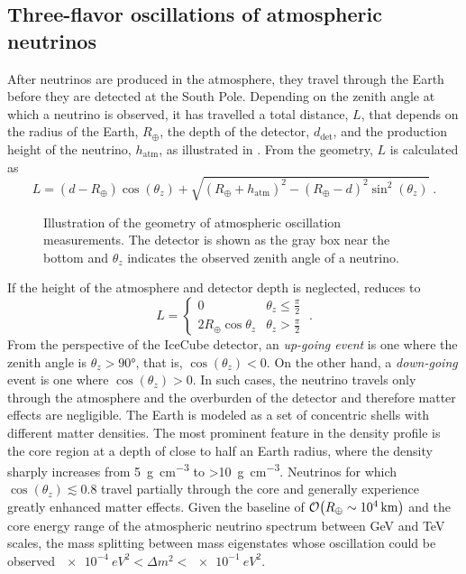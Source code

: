 \subsection{Three-flavor oscillations of atmospheric neutrinos}
After neutrinos are produced in the atmosphere, they travel through the Earth before they are detected at the South Pole. Depending on the zenith angle at which a neutrino is observed, it has travelled a total distance, $L$, that depends on the radius of the Earth, $R_\oplus$, the depth of the detector, $d_\mathrm{det}$, and the production height of the neutrino, $h_\mathrm{atm}$, as illustrated in . From the geometry, $L$ is calculated as
\begin{equation}
    L = (d - R_\oplus)\cos(\theta_z) + \sqrt{(R_\oplus + h_\mathrm{atm})^2 - (R_\oplus - d)^2\sin^2(\theta_z)}\;.\label{eq:prop-distance}
\end{equation}
\begin{figure}
    \centering
    
    \caption{Illustration of the geometry of atmospheric oscillation measurements. The detector is shown as the gray box near the bottom and $\theta_z$ indicates the observed zenith angle of a neutrino.\label{fig:atmo-baseline-illustration}}
\end{figure}
If the height of the atmosphere and detector depth is neglected,  reduces to
\begin{equation}
    L =
    \begin{cases}
        0 & \theta_z \leq \frac{\pi}{2} \\
        2 R_\oplus \cos \theta_z & \theta_z > \frac{\pi}{2}
    \end{cases}\;.
\end{equation}
From the perspective of the IceCube detector, an \emph{up-going event} is one where the zenith angle is $\theta_z > \ang{90}$, that is, $\cos(\theta_z) < 0$. On the other hand, a \emph{down-going} event is one where $\cos(\theta_z) > 0$. In such cases, the neutrino travels only through the atmosphere and the overburden of the detector and therefore matter effects are negligible.  The Earth is modeled as a set of concentric shells with different matter densities. The most prominent feature in the density profile is the core region at a depth of close to half an Earth radius, where the density sharply increases from \SI{5}{\gram\per\centi\meter\cubed} to \SI{>10}{\gram\per\centi\meter\cubed}\cite{PREM}. Neutrinos for which $\cos(\theta_z) \lesssim 0.8$ travel partially through the core and generally experience greatly enhanced matter effects. Given the baseline of $\order{R_\oplus\sim\SI{e4}{km}}$ and the core energy range of the atmospheric neutrino spectrum between GeV and TeV scales, the mass splitting between mass eigenstates whose oscillation could be observed $\SI{e-4}{eV^2} < \Delta m^2 < \SI{e-1}{eV^2}$.

